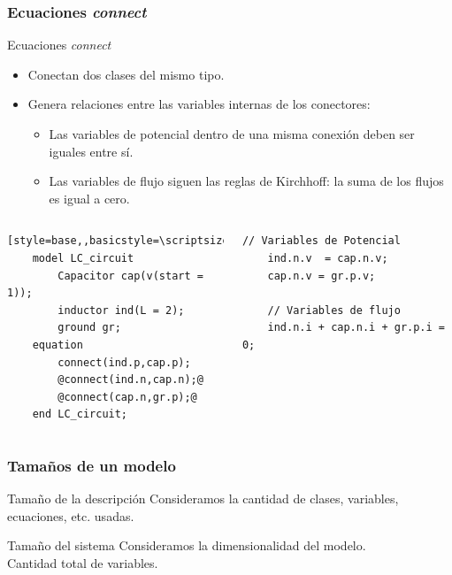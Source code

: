 \documentclass[aspectratio=169,10pt]{beamer}
\begin{document}
\begin{frame}[fragile]
\frametitle{Ecuaciones \textit{connect}} 
\begin{block}{Ecuaciones \textit{connect}}
    \begin{itemize}
        \item Conectan dos clases del mismo tipo.
        \item Genera relaciones entre las variables internas de los conectores:
            \begin{itemize}
                \item Las variables de potencial dentro de una misma conexión deben ser iguales entre sí.
                \item Las variables de flujo siguen las reglas de Kirchhoff: la suma de los flujos es igual a cero. 
        \end{itemize}
    \end{itemize}
\end{block}{}

\begin{columns}  
\column[T]{8cm}
 \begin{lstlisting}[style=base,,basicstyle=\scriptsize]
    model LC_circuit
        Capacitor cap(v(start = 1));
        inductor ind(L = 2);
        ground gr;
    equation
        connect(ind.p,cap.p);
        @connect(ind.n,cap.n);@
        @connect(cap.n,gr.p);@
    end LC_circuit;
\end{lstlisting}
\column[T]{6cm}
 \begin{lstlisting}[style=base]
    // Variables de Potencial 
    ind.n.v  = cap.n.v;
    cap.n.v = gr.p.v;
    
    // Variables de flujo 
    ind.n.i + cap.n.i + gr.p.i = 0;
\end{lstlisting}
\end{columns}
\end{frame}


\begin{frame}[fragile]
\frametitle{Tama\~nos de un modelo} 
\begin{block}{Tamaño de la descripción}
Consideramos la cantidad de clases, variables, ecuaciones, etc. usadas.
\end{block}
\vspace{1cm}
\begin{block}{Tamaño del sistema}
Consideramos la dimensionalidad del modelo. \\
Cantidad total de variables. 
\end{block}
\end{frame}
\end{document}

